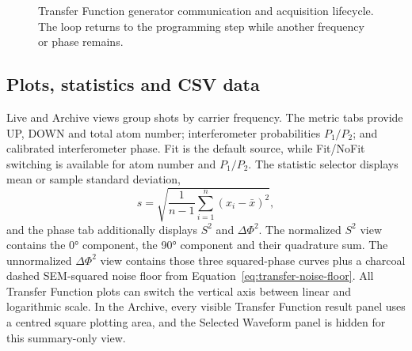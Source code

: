 \documentclass[11pt,oneside,openany]{book}
\begin{document}
\begin{figure}[htbp]
\centering
{}
\caption{Transfer Function generator communication and acquisition lifecycle. The loop
returns to the programming step while another frequency or phase remains.}
\label{fig:transfer-execution}
\end{figure}

\subsection{Plots, statistics and CSV data}
Live and Archive views group shots by carrier frequency. The metric tabs provide UP, DOWN
and total atom number; interferometer probabilities $P_1/P_2$; and calibrated
interferometer phase. Fit is the default source, while Fit/NoFit switching is available
for atom number and $P_1/P_2$. The statistic selector displays mean or sample standard
deviation,
\begin{equation}
  s=\sqrt{\frac{1}{n-1}\sum_{i=1}^{n}(x_i-\bar{x})^2},
\end{equation}
and the phase tab additionally displays $S^2$ and $\Delta\Phi^2$. The normalized $S^2$
view contains the \ang{0} component, the \ang{90} component and their quadrature sum. The
unnormalized $\Delta\Phi^2$ view contains those three squared-phase curves plus a charcoal
dashed SEM-squared noise floor from Equation~\eqref{eq:transfer-noise-floor}.
All Transfer Function plots can switch
the vertical axis between linear and logarithmic scale.
In the Archive, every visible Transfer Function result panel uses a centred square plotting
area, and the Selected Waveform panel is hidden for this summary-only view.
\end{document}
